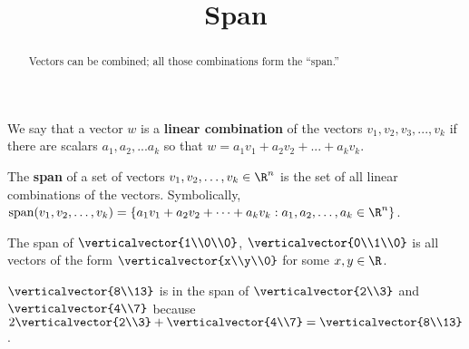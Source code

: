 \documentclass{ximera}
\title{Span}
\begin{document}
\begin{abstract}
  Vectors can be combined; all those combinations form the ``span.''
\end{abstract}

\begin{definition}
  We say that a vector $w$ is a \textbf{linear combination} of the vectors $v_1,v_2,v_3,...,v_k$ if there are scalars $a_1,a_2,...a_k$ 
  so that $w = a_1v_1+a_2v_2+...+a_kv_k$.
\end{definition}
  		
\begin{definition}
  The \textbf{span} of a set of vectors $v_1,v_2,\dots,v_k \in \R^n$ is the set of all linear combinations of the vectors.
  Symbolically, $\text{span}(v_1,v_2,\dots,v_k) = \{ a_1v_1+a_2v_2+\cdots+a_kv_k : a_1,a_2,\dots,a_k \in \R^n\}$.
\end{definition}

\begin{example}
  The span of $\verticalvector{1\\0\\0}$, $\verticalvector{0\\1\\0}$ is all vectors of the form $\verticalvector{x\\y\\0}$ for some $x,y \in \R$.
\end{example}

\begin{example}
  $\verticalvector{8\\13}$ is in the span of $\verticalvector{2\\3}$ and $\verticalvector{4\\7}$ because
  $2\verticalvector{2\\3} + \verticalvector{4\\7} = \verticalvector{8\\13}$. 
\end{example}
\end{document}

